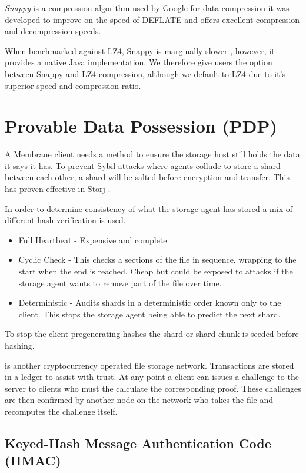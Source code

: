 \documentclass[11pt, a4paper, twocolumn, twoside]{report}
\begin{document}
\emph{Snappy} is a compression algorithm used by Google for data compression it was developed to improve on the speed of DEFLATE and offers excellent compression and decompression speeds. \citep{google2017snappy}

When benchmarked against LZ4, Snappy is marginally slower \citep{vorontsov2015compression}, however, it provides a native Java implementation. We therefore give users the option between Snappy and LZ4 compression, although we default to LZ4 due to it's superior speed and compression ratio. \citep{lz42017lz4}

\section{Provable Data Possession (PDP)} \label{sec:poo}

A Membrane client needs a method to ensure the storage host still holds the data it says it has. To prevent Sybil attacks where agents collude to store a shard between each other, a shard will be salted before encryption and transfer. This has proven effective in Storj \citep{Wilkinson14storja}.

In order to determine consistency of what the storage agent has stored a mix of different hash verification is used.
\begin{itemize}
 \item Full Heartbeat - Expensive and complete
 \item Cyclic Check - This checks a sections of the file in sequence, wrapping to the start when the end is reached. Cheap but could be exposed to attacks if the storage agent wants to remove part of the file over time.
 \item Deterministic - Audits shards in a deterministic order known only to the client. This stops the storage agent being able to predict the next shard.
\end{itemize}

To stop the client pregenerating hashes the shard or shard chunk is seeded before hashing.

\cite{filecoin2014filecoin} is another cryptocurrency operated file storage network. Transactions are stored in a ledger to assist with trust. At any point a client can issues a challenge to the server to clients who must the calculate the corresponding proof. These challenges are then confirmed by another node on the network who takes the file and recomputes the challenge itself.

\subsection{Keyed-Hash Message Authentication Code (HMAC)}
\end{document}
